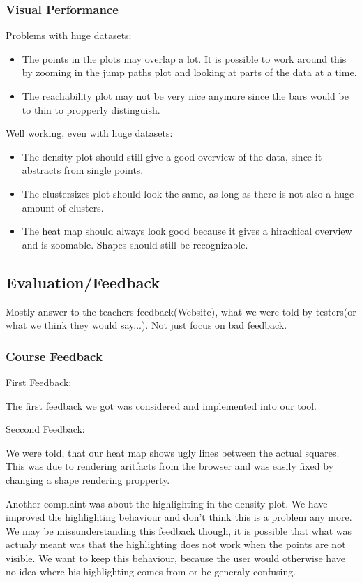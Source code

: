 \documentclass{vgtc}                          %
\begin{document}
\subsubsection{Visual Performance}
 Problems with huge datasets:
\begin{itemize}
\item The points in the plots may overlap a lot. It is possible to work around this by zooming in the jump paths plot and looking at parts of the data at a time.
\item The reachability plot may not be very nice anymore since the bars would be to thin to propperly distinguish.
\end{itemize}
Well working, even with huge datasets:
\begin{itemize}
\item The density plot should still give a good overview of the data, since it abstracts from single points.
\item The clustersizes plot should look the same, as long as there is not also a huge amount of clusters.
\item The heat map should always look good because it gives a hirachical overview and is zoomable. Shapes should still be recognizable.
\end{itemize}
\subsection{Evaluation/Feedback}
Mostly answer to the teachers feedback(Website), what we were told by testers(or what we think they would say...). Not just focus on bad feedback.
\subsubsection{Course Feedback}

First Feedback:

The first feedback we got was considered and implemented into our tool.

\noindent Seccond Feedback:

We were told, that our heat map shows ugly lines between the actual squares. This was due to rendering aritfacts from the browser and was easily fixed by changing a shape rendering propperty.

Another complaint was about the highlighting in the density plot. We have improved the highlighting behaviour and don't think this is a problem any more. We may be missunderstanding this feedback though, it is possible that what was actualy meant was that the highlighting does not work when the points are not visible. We want to keep this behaviour, because the user would otherwise have no idea where his highlighting comes from or be generaly confusing.
\end{document}
